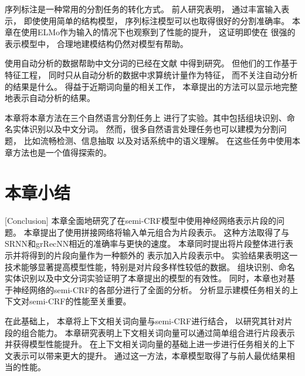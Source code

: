 序列标注是一种常用的分割任务的转化方式。
前人研究表明，
通过丰富输入表示，
即使使用简单的结构模型，
序列标注模型可以也取得很好的分割准确率\cite{peters-EtAl:2017:Long,peters-EtAl:2018:N18-1,DBLP:journals/corr/abs-1810-04805,akbik-blythe-vollgraf:2018:C18-1,Liu2018EmpowerSL}。
本章在使用ELMo作为输入的情况下也观察到了性能的提升，
这证明即使在
很强的表示模型中，
合理地建模结构仍然对模型有帮助。

使用自动分析的数据帮助中文分词的已经在文献
中得到研究。
但他们的工作基于特征工程，
同时只从自动分析的数据中求算统计量作为特征，
而不关注自动分析的结果是什么。
得益于近期词向量\cite{NIPS2013_5021}的相关工作，
本章提出的方法可以显示地完整地表示自动分析的结果。

本章将本章方法在三个自然语言分割任务上
进行了实验。其中包括组块识别、命名实体识别以及中文分词。
然而，很多自然语言处理任务也可以建模为分割问题，
比如流畅检测\cite{ferguson-durrett-klein:2015:NAACL-HLT}、信息抽取
以及对话系统中的语义理解\cite{6998838}。
在这些任务中使用本章方法也是一个值得探索的。

\section{本章小结}[Conclusion]
本章全面地研究了在semi-CRF模型中使用神经网络表示片段的问题。
本章提出了使用拼接网络将输入单元组合为片段表示。
这种方法取得了与SRNN和grRecNN相近的准确率与更快的速度。
本章同时提出将片段整体进行表示并将得到的片段向量作为一种额外的
表示加入片段表示中。
实验结果表明这一技术能够显著提高模型性能，特别是对片段多样性较低的数据。
组块识别、命名实体识别以及中文分词实验证明了本章提出的模型的有效性。
同时，本章也对基于神经网络的semi-CRF的各部分进行了全面的分析。
分析显示建模任务相关的上下文对semi-CRF的性能至关重要。

在此基础上，
本章将上下文相关词向量与semi-CRF进行结合，
以研究其针对片段的组合能力。
本章研究表明上下文相关词向量可以通过简单组合进行片段表示并获得模型性能提升。
在上下文相关词向量的基础上进一步进行任务相关的上下文表示可以带来更大的提升。
通过这一方法，本章模型取得了与前人最优结果相当的性能。
